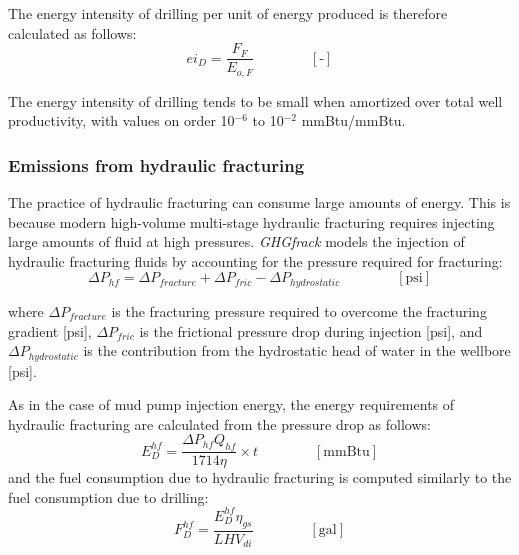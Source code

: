 \documentclass[11pt]{report}
\newcommand{\eqnunit}[1]{\quad\quad \scriptstyle{\left[\text{#1}\right]}}
\begin{document}
The energy intensity of drilling per unit of energy produced is therefore calculated as follows:
\begin{equation}
ei_{D} = \frac{F_{F}}{E_{o,F}} \quad\quad\eqnunit{-}
\end{equation}

The energy intensity of drilling tends to be small when amortized over total well productivity, with values on order 10$^{-6}$ to 10$^{-2}$ mmBtu/mmBtu.

\subsubsection{Emissions from hydraulic fracturing}

The practice of hydraulic fracturing can consume large amounts of energy. This is because modern high-volume multi-stage hydraulic fracturing requires injecting large amounts of fluid at high pressures.  \emph{GHGfrack} models the injection of hydraulic fracturing fluids by accounting for the pressure required for fracturing:
\begin{equation}
\Delta P_{hf} = \Delta P_{fracture} + \Delta P_{fric} - \Delta P_{hydrostatic}  \quad\quad\eqnunit{psi} 
\end{equation}

where $\Delta P_{fracture}$ is the fracturing pressure required to overcome the fracturing gradient [psi], $ \Delta P_{fric}$ is the frictional pressure drop during injection [psi], and $\Delta P_{hydrostatic}$ is the contribution from the hydrostatic head of water in the wellbore [psi].

As in the case of mud pump injection energy, the energy requirements of hydraulic fracturing are calculated from the pressure drop as follows:
\begin{equation}
E_{D}^{hf} = \frac{\Delta P_{hf} Q_{hf}}{1714 \eta} \times t \quad\quad\eqnunit{mmBtu} 
\end{equation}
and the fuel consumption due to hydraulic fracturing is computed similarly to the fuel consumption due to drilling:
\begin{equation}
F_{D}^{hf} = \frac{E_{D}^{hf} \eta_{gs}}{LHV_{di}} \quad\quad\eqnunit{gal}
\end{equation}
\end{document}
